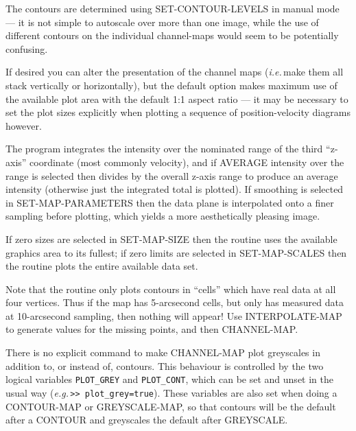 \documentclass[11pt,twoside]{report}
\newcommand{\eg}{{\it e.g.\,}}
\newcommand{\ie}{{\it i.e.\,}}
\begin{document}
The contours are determined using SET-CONTOUR-LEVELS in manual mode ---
it is not simple to autoscale over more than one image, while the use
of different contours on the individual channel-maps would seem to be
potentially confusing.

If desired you can alter the presentation of the channel maps (\ie make
them all stack vertically or horizontally), but the default option makes
maximum use of the available plot area with the default 1:1 aspect ratio ---
it may be necessary to set the plot sizes explicitly when plotting a sequence
of position-velocity diagrams however.

The program integrates the intensity over the nominated range of the third
``z-axis'' coordinate (most commonly velocity), and if AVERAGE intensity
over the range is selected then divides by the overall z-axis range to
produce an average intensity (otherwise just the integrated total is plotted).
If smoothing is selected in SET-MAP-PARAMETERS then the data plane is
interpolated onto a finer sampling before plotting, which yields a more
aesthetically pleasing image.

If zero sizes are selected in SET-MAP-SIZE then the routine uses the
available graphics area to its fullest; if zero limits are selected in
SET-MAP-SCALES then the routine plots the entire available data set.

Note that the routine only plots contours in ``cells'' which have real
data at all four vertices. Thus if the map has 5-arcsecond cells, but only
has measured data at 10-arcsecond sampling, then nothing will appear! Use
INTERPOLATE-MAP to generate values for the missing points, and then
CHANNEL-MAP.

There is no explicit command to make CHANNEL-MAP plot greyscales in addition
to, or instead of, contours. This behaviour is controlled by the two
logical variables \verb+PLOT_GREY+ and \verb+PLOT_CONT+, which can be set
and unset in the usual way (\eg \verb+>> plot_grey=true+). These variables
are also set when doing a CONTOUR-MAP or GREYSCALE-MAP, so that contours
will be the default after a CONTOUR and greyscales the default after GREYSCALE.
\end{document}
